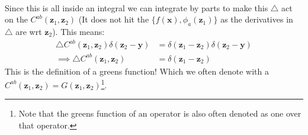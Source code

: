 \documentclass[11pt]{article}
\numberwithin{equation}{section}
\begin{document}
\begin{itemize}
\begin{align*}
       \end{align*}  
       Since this is all inside an integral we can integrate by parts to make this $\triangle$ act on the $C^{ab}\left(\textbf{z}_1,\textbf{z}_2\right)$ (It does not hit the $\{f(\textbf{x}),\phi_a(\textbf{z}_1)\}$ as the derivatives in $\triangle$ are wrt $\textbf{z}_2$). This means:
       \begin{align*}
         \triangle C^{ab}\left(\textbf{z}_1,\textbf{z}_2\right)\delta(\textbf{z}_2-\textbf{y}) &= \delta\left(\textbf{z}_1-\textbf{z}_2\right)\delta(\textbf{z}_2-\textbf{y}) \\
          \implies \triangle C^{ab}\left(\textbf{z}_1,\textbf{z}_2\right) &= \delta\left(\textbf{z}_1-\textbf{z}_2\right)
       \end{align*}
       This is the definition of a greens function! Which we often denote with a $C^{ab}\left(\textbf{z}_1,\textbf{z}_2\right) =G(\textbf{z}_1,\textbf{z}_2)$\footnote{Note that the greens function of an operator is also often denoted as one over that operator.}.
\end{itemize}
\end{document}
